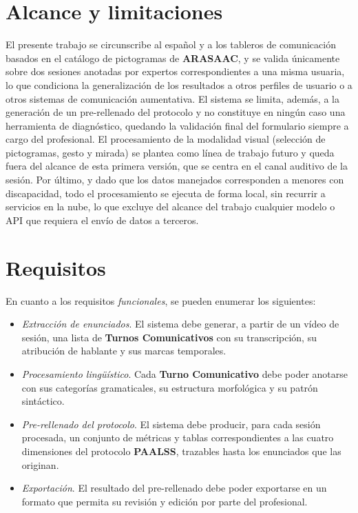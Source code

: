 \section{Alcance y limitaciones}

El presente trabajo se circunscribe al español y a los tableros de comunicación basados en
el catálogo de pictogramas de \textbf{\ac{ARASAAC}}, y se valida únicamente sobre dos sesiones
anotadas por expertos correspondientes a una misma usuaria, lo que condiciona la
generalización de los resultados a otros perfiles de usuario o a otros sistemas de
comunicación aumentativa. El sistema se limita, además, a la generación de un
pre-rellenado del protocolo y no constituye en ningún caso una herramienta de diagnóstico,
quedando la validación final del formulario siempre a cargo del profesional. El
procesamiento de la modalidad visual (selección de pictogramas, gesto y mirada) se
plantea como línea de trabajo futuro y queda fuera del alcance de esta primera versión, que
se centra en el canal auditivo de la sesión. Por último, y dado que los datos manejados
corresponden a menores con discapacidad, todo el procesamiento se ejecuta de forma local,
sin recurrir a servicios en la nube, lo que excluye del alcance del trabajo cualquier
modelo o API que requiera el envío de datos a terceros.

\section{Requisitos}

En cuanto a los requisitos \emph{funcionales}, se pueden enumerar los siguientes:

\begin{itemize}
  \item \emph{Extracción de enunciados}. El sistema debe generar, a partir de un vídeo de
  sesión, una lista de \textbf{Turnos Comunicativos} con su transcripción, su atribución de
  hablante y sus marcas temporales.
  \item \emph{Procesamiento lingüístico}. Cada \textbf{Turno Comunicativo} debe poder anotarse con
  sus categorías gramaticales, su estructura morfológica y su patrón sintáctico.
  \item \emph{Pre-rellenado del protocolo}. El sistema debe producir, para cada sesión
  procesada, un conjunto de métricas y tablas correspondientes a las cuatro dimensiones del
  protocolo \textbf{\ac{PAALSS}}, trazables hasta los enunciados que las originan.
  \item \emph{Exportación}. El resultado del pre-rellenado debe poder exportarse en un
  formato que permita su revisión y edición por parte del profesional.
\end{itemize}

